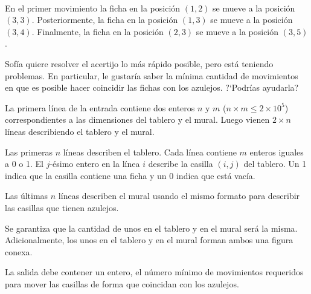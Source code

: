 \documentclass{oci}
\def\nrows{3}
\def\ncols{5}
\newcommand{\drawnumbers}{
  \foreach \col in {1, ..., \ncols} {
    \node at (\col - 0.5, 3.35) {\col};
  }
  \foreach \row in {1, ..., \nrows} {
    \node at (-0.35, \nrows - \row + 0.5) {\row};
  }
}
\begin{document}
\begin{problemDescription}
\begin{center}
  ~
\end{center}
En el primer movimiento la ficha en la posición $(1, 2)$ se mueve a la
posición $(3, 3)$.
%
Posteriormente, la ficha en la posición $(1, 3)$ se mueve a la posición
$(3, 4)$.
%
Finalmente, la ficha en la posición $(2, 3)$ se mueve a la posición  $(3, 5)$.

Sofía quiere resolver el acertijo lo más rápido posible, pero está
teniendo problemas.
En particular, le gustaría saber la mínima cantidad de movimientos
en que es posible hacer coincidir las fichas con los azulejos.
?`Podrías ayudarla?

\end{problemDescription}

\begin{inputDescription}
  La primera línea de la entrada contiene dos enteros $n$ y $m$ ($n \times m \leq 2 \times 10^5$)
  correspondientes a las dimensiones del tablero y el mural.
  Luego vienen $2 \times n$ líneas describiendo el tablero y el mural.

  Las primeras $n$ líneas describen el tablero.
  Cada línea contiene $m$ enteros iguales a 0 o 1.
  El $j$-ésimo entero en la línea $i$ describe la casilla $(i, j)$ del tablero.
  Un 1 indica que la casilla contiene una ficha y un 0 indica que está vacía.

  Las últimas $n$ líneas describen el mural usando el mismo formato para describir
  las casillas que tienen azulejos.

  Se garantiza que la cantidad de unos en el tablero y en el mural será la misma.
  Adicionalmente, los unos en el tablero y en el mural forman ambos una figura conexa.
\end{inputDescription}

\begin{outputDescription}
La salida debe contener un entero, el número mínimo de movimientos
requeridos para mover las casillas de forma que coincidan con
los azulejos.
\end{outputDescription}
\end{document}
